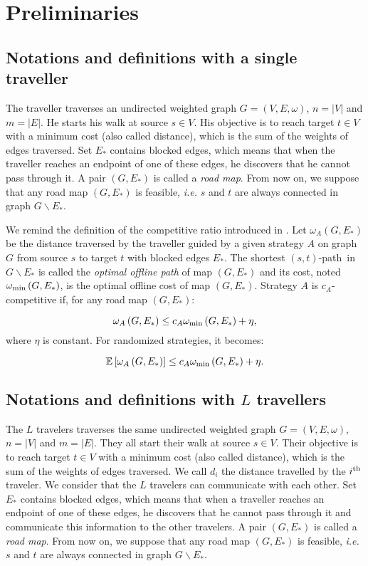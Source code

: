 \documentclass[a4paper, 10pt]{article}
\newcommand{\card}[1]{\left| #1 \right|}
\newcommand{\ith}[1]{#1^{\mbox{\scriptsize{th}}}}
\newcommand{\stpath}{$(s,t)$-path}
\newcommand{\omegamin}{\omega_{\mbox{\scriptsize{min}}}}
\begin{document}
\section{Preliminaries}

\subsection{Notations and definitions with a single traveller} 
The traveller traverses an undirected weighted graph $G=\left(V,E,\omega\right)$, $n = \card{V}$ and $m = \card{E}$. He starts his walk at source $s \in V$. His objective is to reach target $t\in V$ with a minimum cost (also called distance), which is the sum of the weights of edges traversed. Set $E_*$ contains blocked edges, which means that when the traveller reaches an endpoint of one of these edges, he discovers that he cannot pass through it. A pair $\left(G,E_*\right)$ is called a \textit{road map}. From now on, we suppose that any road map $\left(G,E_*\right)$ is feasible, {\em i.e.} $s$ and $t$ are always connected in graph $G\backslash E_*$.

We remind the definition of the competitive ratio introduced in \cite{BoEl98}. Let $\omega_A\left(G,E_*\right)$ be the distance traversed by the traveller guided by a given strategy $A$ on graph $G$ from source $s$ to target $t$ with blocked edges $E_*$. The shortest \stpath ~in $G\backslash E_*$ is called the \textit{optimal offline path} of map $\left(G,E_*\right)$ and its cost, noted $\omegamin\left(G,E_*\right)$, is the optimal offline cost of map $\left(G,E_*\right)$. Strategy $A$ is $c_A$-competitive if, for any road map $\left(G,E_*\right)$:

\[
\omega_A\left(G,E_*\right) \leq c_A\omegamin\left(G,E_*\right) + \eta,
\]
where $\eta$ is constant. For randomized strategies, it becomes:

\[
\mathbb{E}\left[\omega_A\left(G,E_*\right)\right] \leq c_A\omegamin\left(G,E_*\right) + \eta.
\]

\subsection{Notations and definitions with $L$ travellers}

The $L$ travelers traverses the same undirected weighted graph $G=\left(V,E,\omega\right)$, $n = \card{V}$ and $m = \card{E}$. They all start their walk at source $s \in V$. Their objective is to reach target $t\in V$ with a minimum cost (also called distance), which is the sum of the weights of edges traversed. We call $d_i$ the distance travelled by the $\ith{i}$ traveler. We consider that the $L$ travelers can communicate with each other. Set $E_*$ contains blocked edges, which means that when a traveller reaches an endpoint of one of these edges, he discovers that he cannot pass through it and communicate this information to the other travelers. A pair $\left(G,E_*\right)$ is called a \textit{road map}. From now on, we suppose that any road map $\left(G,E_*\right)$ is feasible, {\em i.e.} $s$ and $t$ are always connected in graph $G\backslash E_*$.
\end{document}
